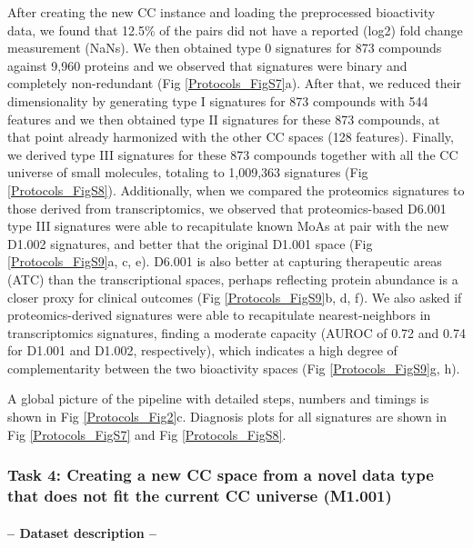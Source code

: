 After creating the new CC instance and loading the preprocessed bioactivity data, we found that 12.5\% of the pairs did not have a reported (log2) fold change measurement (NaNs). We then obtained type 0 signatures for 873 compounds against 9,960 proteins and we observed that signatures were binary and completely non-redundant (Fig \ref{Protocols_FigS7}a). After that, we reduced their dimensionality by generating type I signatures for 873 compounds with 544 features and we then obtained type II signatures for these 873 compounds, at that point already harmonized with the other CC spaces (128 features). Finally, we derived type III signatures for these 873 compounds together with all the CC universe of small molecules, totaling to 1,009,363 signatures (Fig \ref{Protocols_FigS8}). Additionally, when we compared the proteomics signatures to those derived from transcriptomics, we observed that proteomics-based D6.001 type III signatures were able to recapitulate known MoAs at pair with the new D1.002 signatures, and better that the original D1.001 space (Fig \ref{Protocols_FigS9}a, c, e). D6.001 is also better at capturing therapeutic areas (ATC) than the transcriptional spaces, perhaps reflecting protein abundance is a closer proxy for clinical outcomes (Fig \ref{Protocols_FigS9}b, d, f). We also asked if proteomics-derived signatures were able to recapitulate nearest-neighbors in transcriptomics signatures, finding a moderate capacity (AUROC of 0.72 and 0.74 for D1.001 and D1.002, respectively), which indicates a high degree of complementarity between the two bioactivity spaces (Fig \ref{Protocols_FigS9}g, h).

A global picture of the pipeline with detailed steps, numbers and timings is shown in Fig \ref{Protocols_Fig2}c. Diagnosis plots for all signatures are shown in Fig \ref{Protocols_FigS7} and Fig \ref{Protocols_FigS8}. 


\subsubsection{Task 4: Creating a new CC space from a novel data type that does not fit the current CC universe (M1.001)}


\paragraph{-- Dataset description --} \leavevmode

